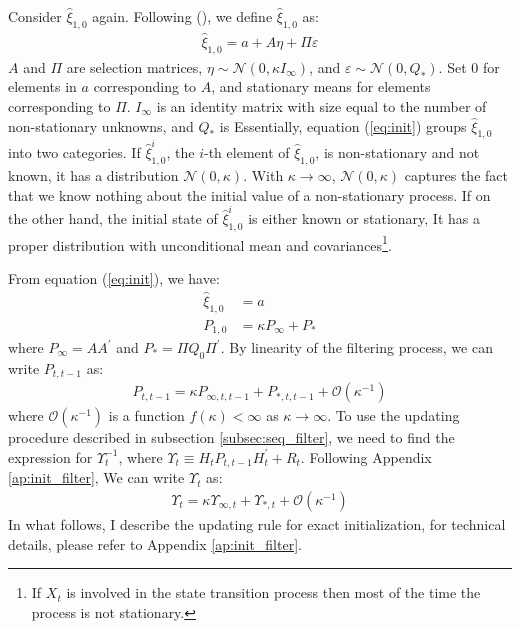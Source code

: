 \documentclass[12pt]{article}
\numberwithin{equation}{section}
\begin{document}
Consider $\hat{\xi}_{1,0}$ again. Following (\cite{koopman_1997}), we define $\hat{\xi}_{1,0}$ as:
\begin{align}
    \hat{\xi}_{1,0} = a + A\eta + \Pi\varepsilon \label{eq:init}
\end{align}
$A$ and $\Pi$ are selection matrices, $\eta\sim\mathcal{N}(0,\kappa I_{\infty})$, and $\varepsilon\sim\mathcal{N}(0,Q_{*})$. Set $0$ for elements in $a$ corresponding to $A$, and stationary means for elements corresponding to $\Pi$. $I_{\infty}$ is an identity matrix with size equal to the number of non-stationary unknowns, and $Q_{*}$ is Essentially, equation (\ref{eq:init}) groups $\hat{\xi}_{1,0}$ into two categories. If $\hat{\xi}_{1,0}^i$, the $i$-th element of $\hat{\xi}_{1,0}$, is non-stationary and not known, it has a distribution $\mathcal{N}(0, \kappa)$. With $\kappa\rightarrow\infty$, $\mathcal{N}(0,\kappa)$ captures the fact that we know nothing about the initial value of a non-stationary process. If on the other hand, the initial state of $\hat{\xi}_{1,0}^i$ is either known or stationary, It has a proper distribution with unconditional mean and covariances\footnote{If $X_t$ is involved in the state transition process then most of the time the process is not stationary.}. 

From equation (\ref{eq:init}), we have:
\begin{align*}
    \hat{\xi}_{1,0} &= a \\
    P_{1,0} &= \kappa P_{\infty} + P_{*}
\end{align*}
where $P_{\infty}=AA^{'}$ and $P_{*}=\Pi Q_0 \Pi^{'}$. By linearity of the filtering process, we can write $P_{t,t-1}$ as:
\begin{align}
    P_{t,t-1} = \kappa P_{\infty,t,t-1} + P_{*,t,t-1} + \mathcal{O}(\kappa^{-1}) \label{eq:P_diffuse}
\end{align}
where $\mathcal{O}(\kappa^{-1})$ is a function $f(\kappa)<\infty$ as $\kappa\rightarrow\infty$. To use the updating procedure described in subsection \ref{subsec:seq_filter}, we need to find the expression for $\Upsilon_t^{-1}$, where $\Upsilon_t\equiv H_tP_{t,t-1}H_t^{'}+R_t$. Following Appendix \ref{ap:init_filter}, We can write $\Upsilon_{t}$ as:
\begin{align*}
    \Upsilon_t = \kappa\Upsilon_{\infty,t} + \Upsilon_{*,t} + \mathcal{O}(\kappa^{-1})
\end{align*}
In what follows, I describe the updating rule for exact initialization, for technical details, please refer to Appendix \ref{ap:init_filter}.
\end{document}
